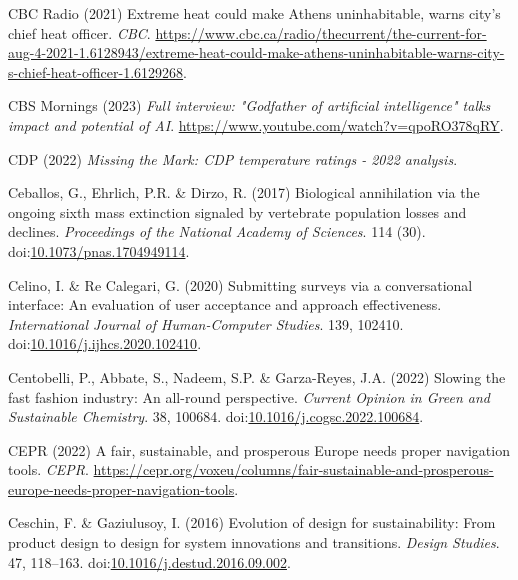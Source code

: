 \documentclass[
  letterpaper,
  DIV=11,
  numbers=noendperiod]{scrartcl}
\newlength{\cslhangindent}
\newenvironment{CSLReferences}[2] %
 {\begin{list}{}{%
  \setlength{\itemindent}{0pt}
  \setlength{\leftmargin}{0pt}
  \setlength{\parsep}{0pt}
  \ifodd #1
   \setlength{\leftmargin}{\cslhangindent}
   \setlength{\itemindent}{-1\cslhangindent}
  \fi
  \setlength{\itemsep}{#2\baselineskip}}}
 {\end{list}}
\begin{document}
\begin{CSLReferences}{0}{1}
CBC Radio (2021) Extreme heat could make {Athens} uninhabitable, warns
city's chief heat officer. \emph{CBC}.
\url{https://www.cbc.ca/radio/thecurrent/the-current-for-aug-4-2021-1.6128943/extreme-heat-could-make-athens-uninhabitable-warns-city-s-chief-heat-officer-1.6129268}.

CBS Mornings (2023) \emph{Full interview: "{Godfather} of artificial
intelligence" talks impact and potential of {AI}}.
\url{https://www.youtube.com/watch?v=qpoRO378qRY}.

CDP (2022) \emph{Missing the {Mark}: {CDP} temperature ratings - 2022
analysis}.

Ceballos, G., Ehrlich, P.R. \& Dirzo, R. (2017) Biological annihilation
via the ongoing sixth mass extinction signaled by vertebrate population
losses and declines. \emph{Proceedings of the National Academy of
Sciences}. 114 (30).
doi:\href{https://doi.org/10.1073/pnas.1704949114}{10.1073/pnas.1704949114}.

Celino, I. \& Re Calegari, G. (2020) Submitting surveys via a
conversational interface: {An} evaluation of user acceptance and
approach effectiveness. \emph{International Journal of Human-Computer
Studies}. 139, 102410.
doi:\href{https://doi.org/10.1016/j.ijhcs.2020.102410}{10.1016/j.ijhcs.2020.102410}.

Centobelli, P., Abbate, S., Nadeem, S.P. \& Garza-Reyes, J.A. (2022)
Slowing the fast fashion industry: {An} all-round perspective.
\emph{Current Opinion in Green and Sustainable Chemistry}. 38, 100684.
doi:\href{https://doi.org/10.1016/j.cogsc.2022.100684}{10.1016/j.cogsc.2022.100684}.

CEPR (2022) A fair, sustainable, and prosperous {Europe} needs proper
navigation tools. \emph{CEPR}.
\url{https://cepr.org/voxeu/columns/fair-sustainable-and-prosperous-europe-needs-proper-navigation-tools}.

Ceschin, F. \& Gaziulusoy, I. (2016) Evolution of design for
sustainability: {From} product design to design for system innovations
and transitions. \emph{Design Studies}. 47, 118--163.
doi:\href{https://doi.org/10.1016/j.destud.2016.09.002}{10.1016/j.destud.2016.09.002}.


\end{CSLReferences}
\end{document}
